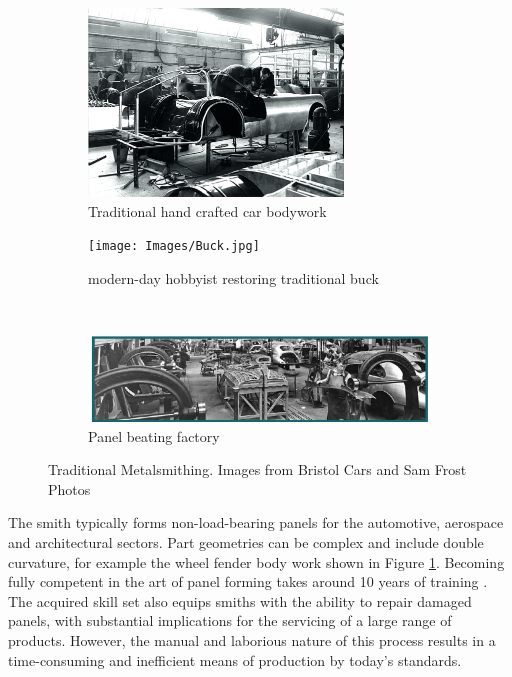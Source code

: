 \begin{figure}[h]
\centering
%
\begin{subfigure}[t]{.45\textwidth}
  \centering
  \includegraphics[height=5cm]{Images/OldCar.png}  
  \caption{Traditional hand crafted car bodywork}
  \label{fig:OldCar}
\end{subfigure}
\begin{subfigure}[t]{.45\textwidth}
  \centering
  \texttt{[image: Images/Buck.jpg]}  
  \caption{modern-day hobbyist restoring traditional buck}
  \label{fig:NewBuck}
\end{subfigure}\\[1ex]
%
\begin{subfigure}{.9\textwidth}
  \centering
  \includegraphics[width=\linewidth]{Images/OldFactory.png}  
  \caption{Panel beating factory}
  \label{fig:OldFactory}
\end{subfigure}
%
\caption{Traditional Metalsmithing. Images from Bristol Cars and Sam Frost Photos}
\label{fig:Background}
\end{figure}

The smith typically forms non-load-bearing panels for the automotive, aerospace and architectural sectors. Part geometries can be complex and include double curvature, for example the wheel fender body work shown in Figure \ref{fig:OldCar}. Becoming fully competent in the art of panel forming takes around 10 years of training \citep{Goodwin2020BehindBeaters}. The acquired skill set also equips smiths with the ability to repair damaged panels, with substantial implications for the servicing of a large range of products. However, the manual and laborious nature of this process results in a time-consuming and inefficient means of production by today's standards.

